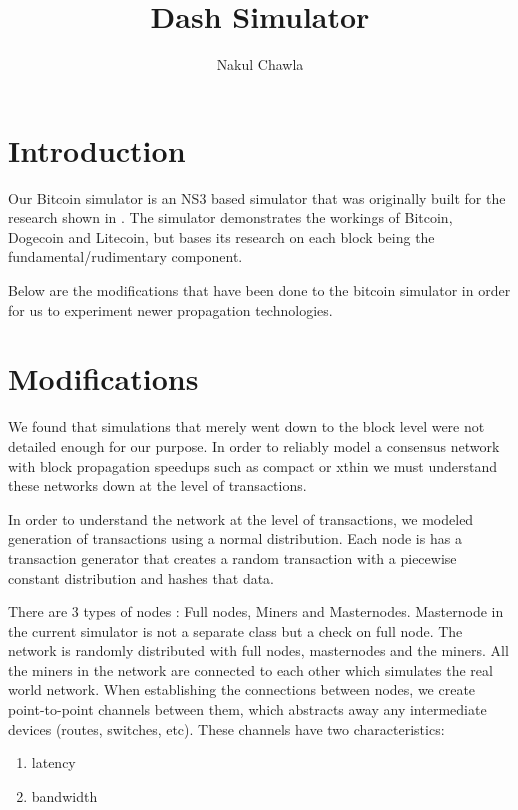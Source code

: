 \documentclass{article}
\title{Dash Simulator}
\author{Nakul Chawla}
\begin{document}
\maketitle


\section{Introduction}
Our Bitcoin simulator is an NS3 based
simulator that was originally built for the research shown in
\cite{security}. The simulator demonstrates the workings of Bitcoin, Dogecoin and
Litecoin, but bases its research on each block being the fundamental/rudimentary component. 

Below are the modifications that have been done to the bitcoin simulator in order for us to experiment newer propagation
technologies.

\section{Modifications}
We found that simulations that merely went down to the block level were not detailed enough for our purpose.  In order to reliably model a consensus network with block propagation speedups such as compact or xthin we must understand these networks down at the level of transactions.

In order to understand the network at the level of transactions, we modeled generation of transactions using a normal
distribution. Each node is has a transaction generator that creates a random transaction with a piecewise constant
distribution and hashes that data.

There are 3 types of nodes : Full nodes, Miners and Masternodes. Masternode in the current simulator is
not a separate class but a check on full node.
The network is randomly distributed with full nodes, masternodes and the miners. All the miners in the network are
connected to each other which simulates the real world network.
When establishing the connections between nodes, we create point-to-point channels between them, which abstracts away
any intermediate devices (routes, switches, etc). These channels have two characteristics: 
\begin{enumerate}
    \item latency
    \item bandwidth
\end{enumerate}
\end{document}
